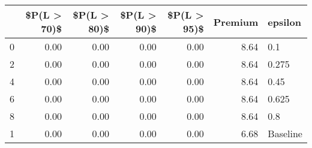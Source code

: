 \begin{tabular}{lrrrrrl}
\toprule
{} &  \$P(L > 70)\$ &  \$P(L > 80)\$ &  \$P(L > 90)\$ &  \$P(L > 95)\$ &  Premium &   epsilon \\
\midrule
0 &         0.00 &         0.00 &         0.00 &         0.00 &     8.64 &       0.1 \\
2 &         0.00 &         0.00 &         0.00 &         0.00 &     8.64 &     0.275 \\
4 &         0.00 &         0.00 &         0.00 &         0.00 &     8.64 &      0.45 \\
6 &         0.00 &         0.00 &         0.00 &         0.00 &     8.64 &     0.625 \\
8 &         0.00 &         0.00 &         0.00 &         0.00 &     8.64 &       0.8 \\
1 &         0.00 &         0.00 &         0.00 &         0.00 &     6.68 &  Baseline \\
\bottomrule
\end{tabular}
